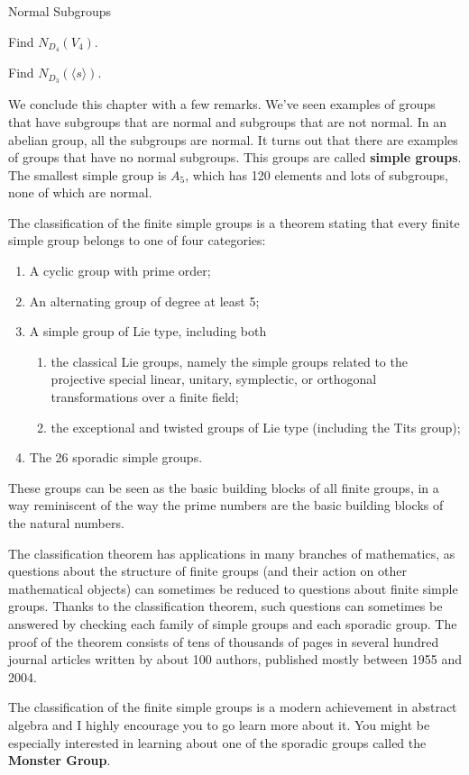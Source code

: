 \begin{section}{Normal Subgroups}
\begin{exercise}
Find $N_{D_4}(V_4)$.
\end{exercise}

\begin{exercise}
Find $N_{D_3}(\langle s\rangle)$.
\end{exercise}

We conclude this chapter with a few remarks.  We've seen examples of groups that have subgroups that are normal and subgroups that are not normal.  In an abelian group, all the subgroups are normal.  It turns out that there are examples of groups that have no normal subgroups.  This groups are called \textbf{simple groups}.  The smallest simple group is $A_5$, which has 120 elements and lots of subgroups, none of which are normal.


The classification of the finite simple groups is a theorem stating that every finite simple group belongs to one of four categories:
\begin{enumerate}
\item A cyclic group with prime order;
\item An alternating group of degree at least 5;
\item A simple group of Lie type, including both 
\begin{enumerate}
\item the classical Lie groups, namely the simple groups related to the projective special linear, unitary, symplectic, or orthogonal transformations over a finite field;
\item the exceptional and twisted groups of Lie type (including the Tits group);
\end{enumerate}
\item The 26 sporadic simple groups.
\end{enumerate}
These groups can be seen as the basic building blocks of all finite groups, in a way reminiscent of the way the prime numbers are the basic building blocks of the natural numbers.

The classification theorem has applications in many branches of mathematics, as questions about the structure of finite groups (and their action on other mathematical objects) can sometimes be reduced to questions about finite simple groups. Thanks to the classification theorem, such questions can sometimes be answered by checking each family of simple groups and each sporadic group.  The proof of the theorem consists of tens of thousands of pages in several hundred journal articles written by about 100 authors, published mostly between 1955 and 2004.

The classification of the finite simple groups is a modern achievement in abstract algebra and I highly encourage you to go learn more about it.  You might be especially interested in learning about one of the sporadic groups called the \textbf{Monster Group}.

\end{section}